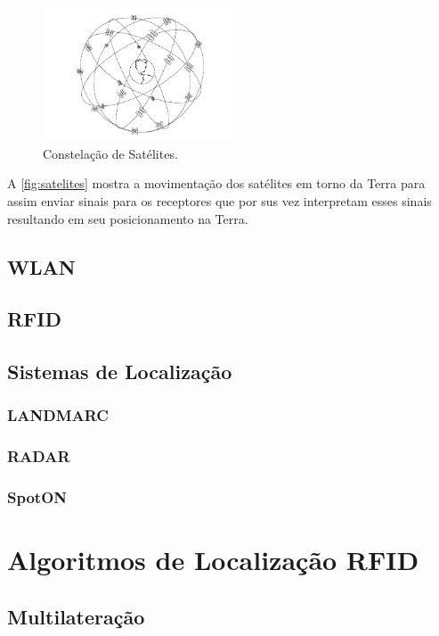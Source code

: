    \begin{figure}[H]
              \caption{\label{fig:satelites}{Constelação de Satélites.}}
              \centering
              \includegraphics[width=0.5\textwidth]{Figuras/gps_satelites.PNG}
        \end{figure}
        \par
        A  \autoref{fig:satelites} mostra a movimentação dos satélites em torno da Terra para assim enviar sinais para os receptores que por sus vez interpretam esses sinais resultando em seu posicionamento na Terra.
    \subsection{WLAN}
    \par
    
    \subsection{RFID}
\subsection{Sistemas de Localização }
    \subsubsection{LANDMARC}
    \subsubsection{RADAR}
    \subsubsection{SpotON}
\section{Algoritmos de Localização RFID}
    \subsection{Multilateração}
